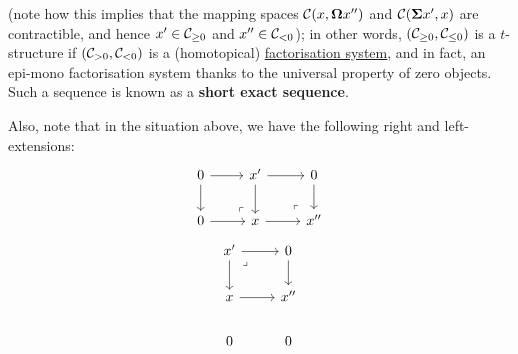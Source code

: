 \begin{definition}[t-structures]
\begin{enumerate}
\begin{enumerate}
$$                                    $$
                                (note how this implies that the mapping spaces $\mathcal{C}(x, \mathbf{\Omega} x'')$ and $\mathcal{C}(\mathbf{\Sigma} x', x)$ are contractible, and hence $x' \in \mathcal{C}_{\geq 0}$ and $x'' \in \mathcal{C}_{< 0}$); in other words, $(\mathcal{C}_{\geq 0}, \mathcal{C}_{\leq 0})$ is a $t$-structure if $(\mathcal{C}_{> 0}, \mathcal{C}_{< 0})$ is a (homotopical) \href{https://ncatlab.org/joyalscatlab/published/Factorisation+systems}{\underline{factorisation system}}, and in fact, an epi-mono factorisation system thanks to the universal property of zero objects. Such a sequence is known as a \textbf{short exact sequence}. 
                                
                                Also, note that in the situation above, we have the following right and left-extensions:
                                    $$
                                        \begin{tikzcd}
                                        	0 & {x'} & 0 \\
                                        	0 & x & {x''}
                                        	\arrow[from=1-3, to=2-3]
                                        	\arrow[from=2-2, to=2-3]
                                        	\arrow[from=1-2, to=2-2]
                                        	\arrow[from=1-2, to=1-3]
                                        	\arrow["\lrcorner"{anchor=center, pos=0.125, rotate=180}, draw=none, from=2-3, to=1-2]
                                        	\arrow[from=1-1, to=2-1]
                                        	\arrow[from=2-1, to=2-2]
                                        	\arrow[from=1-1, to=1-2]
                                        	\arrow["\lrcorner"{anchor=center, pos=0.125, rotate=180}, draw=none, from=2-2, to=1-1]
                                        \end{tikzcd}
                                    $$
                                    $$
                                        \begin{tikzcd}
                                        	{x'} & 0 \\
                                        	x & {x''} \\
                                        	0 & 0
                                        	\arrow[from=1-2, to=2-2]
                                        	\arrow[from=2-1, to=2-2]
                                        	\arrow[from=1-1, to=2-1]
                                        	\arrow[from=1-1, to=1-2]
                                        	\arrow["\lrcorner"{anchor=center, pos=0.125}, draw=none, from=1-1, to=2-2]

\end{tikzcd}$$
\end{enumerate}
\end{enumerate}
\end{definition}
